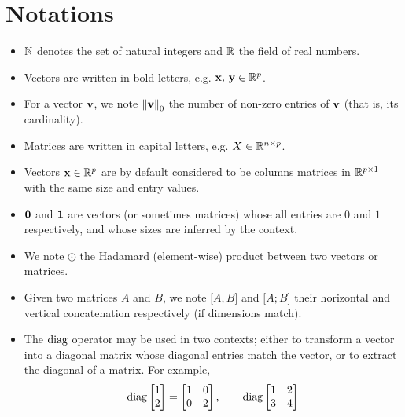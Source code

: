 \cleardoublepage
\chapter*{Notations}

\begin{itemize}
    \item $\mathbb{N}$ denotes the set of natural integers and $\mathbb{R}$ the field of real numbers.
    \item Vectors are written in bold letters, e.g. $\mathbf{x},\, \mathbf{y} \in \mathbb{R}^p$.
    \item For a vector $\mathbf{v}$, we note $\left\lVert\mathbf{v}\right\rVert_0$ the number of non-zero entries of $\mathbf{v}$ (that is, its cardinality).
    \item Matrices are written in capital letters, e.g. $X \in \mathbb{R}^{n \times p}$.
    \item Vectors $\mathbf{x} \in \mathbb{R}^p$ are by default considered to be columns matrices in
        $\mathbb{R}^{p \times 1}$ with the same size and entry values.
    \item $\mathbf{0}$ and $\mathbf{1}$ are vectors (or sometimes matrices) whose all entries are $0$ and $1$ respectively,
        and whose sizes are inferred by the context.
    \item We note $\odot$ the Hadamard (element-wise) product between two vectors or matrices.
    \item Given two matrices $A$ and $B$, we note $\big[ A, B \big]$ and $\big[ A; B \big]$ their horizontal and
        vertical concatenation respectively (if dimensions match).
    \item The $\operatorname*{diag}$ operator may be used in two contexts;
    either to transform a vector into a diagonal matrix whose diagonal entries match the vector,
    or to extract the diagonal of a matrix.
    For example,
    \begin{equation*}
        \diag \begin{bmatrix}
                  1\\
                  2
        \end{bmatrix}
        =
        \begin{bmatrix}
            1 & 0\\
            0 & 2
        \end{bmatrix}
        ,\qquad
        \diag \begin{bmatrix}
                  1 & 2\\
                  3 & 4
        \end{bmatrix}

\end{equation*}
\end{itemize}
